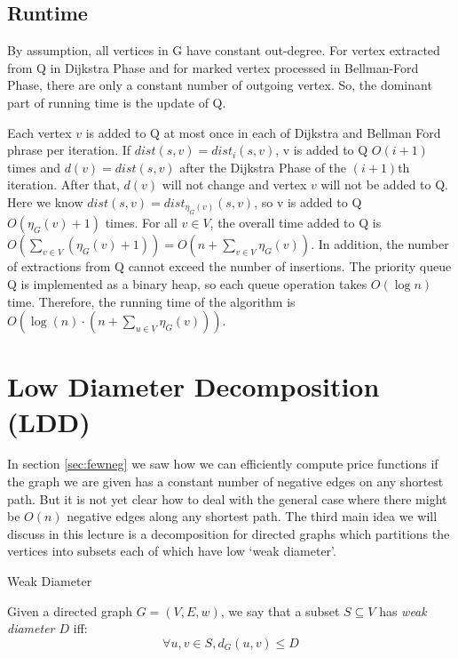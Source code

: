 \documentclass[11pt]{article}
\begin{document}
\subsection{Runtime}
By assumption, all vertices in G have constant out-degree. For vertex extracted from Q in Dijkstra Phase and for marked vertex processed in Bellman-Ford Phase, there are only a constant number of outgoing vertex. So, the dominant part of running time is the update of Q.

Each vertex $v$ is added to Q at most once in each of Dijkstra and Bellman Ford phrase per iteration. If $dist(s, v) = dist_i(s, v)$, v is added to Q $O(i+1)$ times and $d(v) = dist(s, v)$ after the Dijkstra Phase of the $(i+1)$th iteration. After that, $d(v)$ will not change and vertex $v$ will not be added to Q. Here we know $dist(s, v) = dist_{\eta_{G}(v)}(s, v)$, so v is added to Q $O(\eta_G(v) + 1)$ times. For all $v \in V$, the overall time added to Q is $O(\sum_{v \in V}(\eta_G(v)+1)) = O(n + \sum_{v \in V}\eta_G(v))$. In addition, the number of extractions from Q cannot exceed the number of insertions. The priority queue Q is implemented as a binary heap, so each queue operation takes $O(\log n)$ time. Therefore, the running time of the algorithm is $O(\log(n) \cdot (n + \sum_{u \in V}\eta_G(v)))$.

\section{Low Diameter Decomposition (LDD)}
\label{sec:ldd}
In section \ref{sec:fewneg} we saw how we can efficiently compute price functions if the graph we are given has a constant number of negative edges on any shortest path. But it is not yet clear how to deal with the general case where there might be $O(n)$ negative edges along any shortest path. The third main idea we will discuss in this lecture is a decomposition for directed graphs which partitions the vertices into subsets each of which have low `weak diameter'. 

\begin{definition}{Weak Diameter}

    Given a directed graph $G = (V, E, w)$, we say that a subset $S \subseteq V$ has \emph{weak diameter $D$} iff:
    $$\forall u, v \in S, d_G(u,v) \leq D$$
\end{definition}
\end{document}
